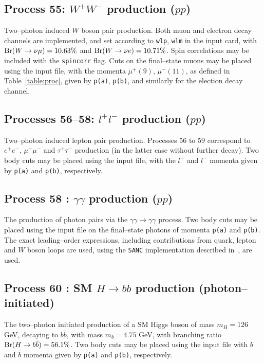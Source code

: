 \documentclass[12pt]{article}
\begin{document}
\subsection{Process 55: $W^+W^-$ production ($pp$)}

Two--photon induced $W$ boson pair production. Both muon and electron decay channels are implemented, and set according to \texttt{wlp}, \texttt{wlm} in the input card, with ${\rm Br}(W\to \nu \mu)=10.63\%$ and ${\rm Br}(W\to \nu e)=10.71\%$. Spin correlations may be  included with the \texttt{spincorr} flag. Cuts on the final--state muons may be placed using the input file, with the momenta $\mu^+(9)$, $\mu^-(11)$, as defined in Table~\ref{table:proc}, given by \texttt{p(a)}, \texttt{p(b)},  and similarly for the election decay channel.

\subsection{Processes 56--58: $l^+l^-$ production ($pp$)}

Two--photon induced lepton pair production. Processes 56 to 59 correspond to $e^+e^-$, $\mu^+\mu^-$ and $\tau^+\tau^-$ production (in the latter case without further decay).  Two body cuts may be placed using the input file, with the $l^+$ and $l^-$ momenta given by \texttt{p(a)} and \texttt{p(b)}, respectively.


\subsection{Process 58 : $\gamma\gamma$ production ($pp$)}

The production of photon pairs via the $\gamma \gamma \to\gamma\gamma$ process. Two body cuts may be placed using the input file on the final--state photons of momenta  \texttt{p(a)} and \texttt{p(b)}.  
The exact leading--order expressions, including contributions from quark, lepton and $W$ boson loops are used, using the \texttt{SANC} implementation described in~\cite{Bardin:2009gq}, are used.

\subsection{Process 60 : SM $H\to b\overline{b}$ production (photon--initiated)}

The two--photon initiated production of a SM Higgs boson of mass $m_H=126$ GeV, decaying to $b\overline{b}$, with mass $m_b=4.75$ GeV, with branching ratio ${\rm Br}(H\to b\overline{b})=56.1\%$. Two body cuts may be placed using the input file with $b$ and $\overline{b}$ momenta given by \texttt{p(a)} and \texttt{p(b)}, respectively.
\end{document}
